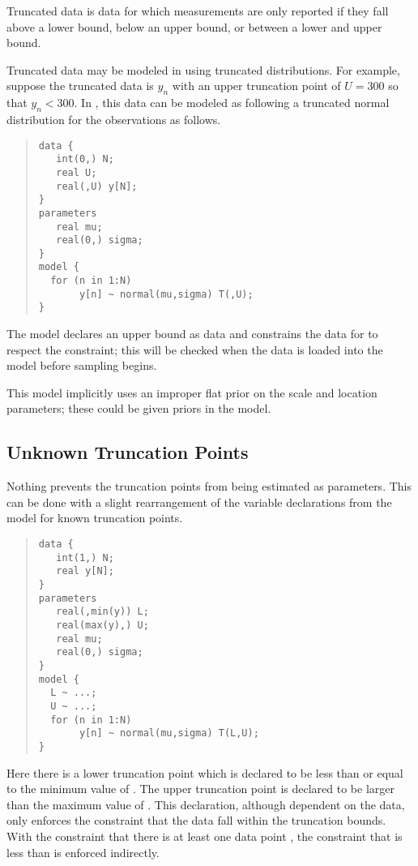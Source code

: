 Truncated data is data for which measurements are only reported if
they fall above a lower bound, below an upper bound, or between a
lower and upper bound.  

Truncated data may be modeled in \Stan using truncated distributions.
For example, suppose the truncated data is $y_n$ with an upper
truncation point of $U = 300$ so that $y_n < 300$.  In \Stan, this
data can be modeled as following a truncated normal distribution for
the observations as follows. 
%
\begin{quote}
\begin{Verbatim} 
data {
   int(0,) N;
   real U;
   real(,U) y[N];
} 
parameters
   real mu;
   real(0,) sigma;
} 
model {
  for (n in 1:N)
       y[n] ~ normal(mu,sigma) T(,U);
}
\end{Verbatim}
\end{quote}
% 
The model declares an upper bound  as data and constrains
the data for  to respect the constraint;  this will be checked
when the data is loaded into the model before sampling begins.

This model implicitly uses an improper flat prior on the scale and
location parameters; these could be given priors in the model.

\subsection{Unknown Truncation Points}

Nothing prevents the truncation points from being estimated as
parameters.  This can be done with a slight rearrangement of the
variable declarations from the model for known truncation points.
%
\begin{quote}
\begin{Verbatim}
data {
   int(1,) N;
   real y[N];
}
parameters
   real(,min(y)) L; 
   real(max(y),) U;
   real mu;
   real(0,) sigma;
}
model {
  L ~ ...;  
  U ~ ...;
  for (n in 1:N)
       y[n] ~ normal(mu,sigma) T(L,U);
}
\end{Verbatim}
\end{quote}
%
Here there is a lower truncation point  which is declared to
be less than or equal to the minimum value of .  The upper
truncation point  is declared to be larger than the maximum
value of .  This declaration, although dependent on the data,
only enforces the constraint that the data fall within the
truncation bounds.  With the constraint that there is at least one
data point , the constraint that  is less than
 is enforced indirectly.


